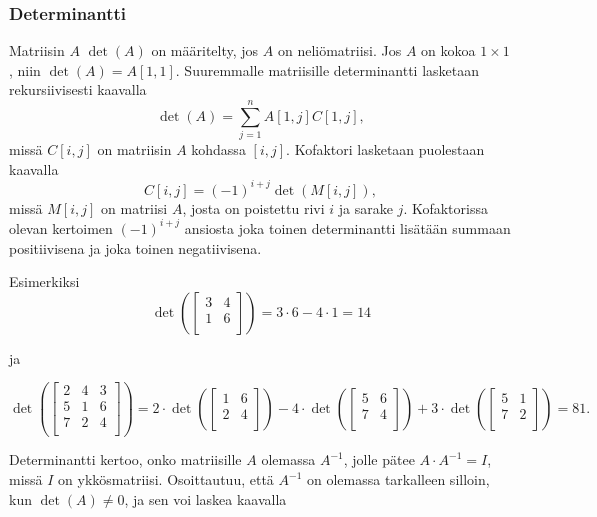 \subsubsection{Determinantti}


Matriisin $A$  $\det(A)$
on määritelty, jos $A$ on neliömatriisi.
Jos $A$ on kokoa $1 \times 1$,
niin $\det(A)=A[1,1]$.
Suuremmalle matriisille determinantti lasketaan rekursiivisesti
kaavalla 
\[\det(A)=\sum_{j=1}^n A[1,j] C[1,j],\]
missä $C[i,j]$ on matriisin $A$ 
kohdassa $[i,j]$.
Kofaktori lasketaan puolestaan kaavalla
\[C[i,j] = (-1)^{i+j} \det(M[i,j]),\]
missä $M[i,j]$ on matriisi $A$, josta on poistettu
rivi $i$ ja sarake $j$.
Kofaktorissa olevan kertoimen $(-1)^{i+j}$ ansiosta
joka toinen determinantti
lisätään summaan positiivisena
ja joka toinen negatiivisena.

\begin{samepage}
Esimerkiksi
\[
\det(
 \begin{bmatrix}
  3 & 4 \\
  1 & 6 \\
 \end{bmatrix}
) = 3 \cdot 6 - 4 \cdot 1 = 14 
\]
\end{samepage}

ja

\[
\det(
 \begin{bmatrix}
  2 & 4 & 3 \\
  5 & 1 & 6 \\
  7 & 2 & 4 \\
 \end{bmatrix}
) = 
2 \cdot
\det(
 \begin{bmatrix}
  1 & 6 \\
  2 & 4 \\
 \end{bmatrix}
)
-4 \cdot
\det(
 \begin{bmatrix}
  5 & 6 \\
  7 & 4 \\
 \end{bmatrix}
)
+3 \cdot
\det(
 \begin{bmatrix}
  5 & 1 \\
  7 & 2 \\
 \end{bmatrix}
) = 81.
\]


Determinantti kertoo, onko matriisille
$A$ olemassa 
$A^{-1}$, jolle pätee $A \cdot A^{-1} = I$,
missä $I$ on ykkösmatriisi.
Osoittautuu, että $A^{-1}$ on olemassa
tarkalleen silloin, kun $\det(A) \neq 0$,
ja sen voi laskea kaavalla

